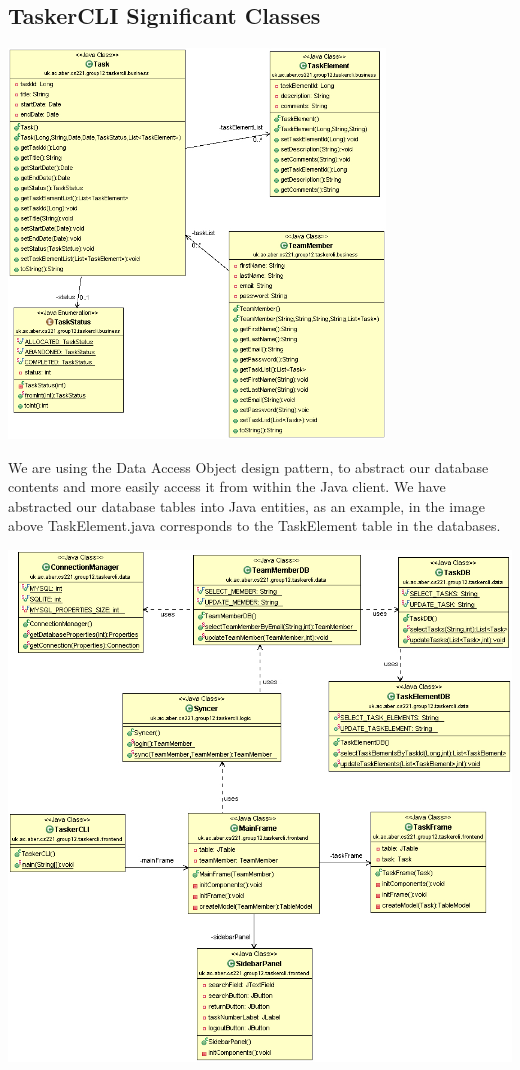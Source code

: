 \documentclass{project}
\begin{document}
\subsection{TaskerCLI Significant Classes}
  \includegraphics[width=0.75\textwidth, center]{images/Detailed-Design/image1.jpg}

  We are using the Data Access Object design pattern, to abstract our database contents and more easily access it from within the Java client.
  We have abstracted our database tables into Java entities, as an example, in the image above TaskElement.java corresponds to the TaskElement table in the databases.
  
  
  
  \includegraphics[width=1\textwidth, center]{images/Detailed-Design/image2.jpg}
  
\end{document}
